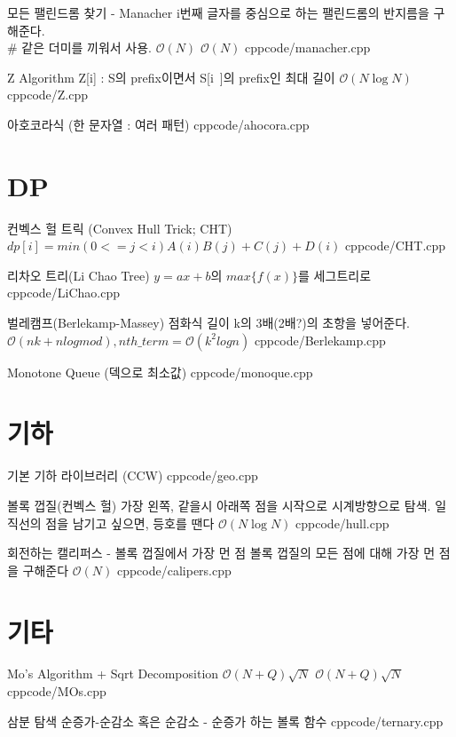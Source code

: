 \documentclass[landscape, 10pt, a4paper, oneside, twocolumn]{extarticle}
\begin{document}
\Algorithm
{모든 팰린드롬 찾기 - Manacher}
{i번째 글자를 중심으로 하는 팰린드롬의 반지름을 구해준다. \\
$\#$ 같은 더미를 끼워서 사용. $\mathcal{O}(N)$
}
{$\mathcal{O}(N)$}
{cpp}{code/manacher.cpp}

\Algorithm
{Z Algorithm}
{Z[i] : S의 prefix이면서 S[i~]의 prefix인 최대 길이}
{$\mathcal{O}(N\log{N})$}
{cpp}{code/Z.cpp}

\Algorithm
{아호코라식 (한 문자열 : 여러 패턴)}
{}
{}
{cpp}{code/ahocora.cpp}


\section{DP}

\Algorithm
{컨벡스 헐 트릭 (Convex Hull Trick; CHT)}
{$dp[i] = min(0 <= j < i){A(i)B(j) + C(j)} + D(i)$}
{}
{cpp}{code/CHT.cpp}

\Algorithm
{리차오 트리(Li Chao Tree)}
{$y=ax+b$의 $max\{f(x)\}$를 세그트리로}
{}
{cpp}{code/LiChao.cpp}

\Algorithm
{벌레캠프(Berlekamp-Massey)}
{점화식 길이 k의 3배(2배?)의 초항을 넣어준다.}
{$\mathcal{O}(nk+nlogmod), nth\_term = \mathcal{O}(k^2logn)$}
{cpp}{code/Berlekamp.cpp}

\Algorithm
{Monotone Queue (덱으로 최소값)}
{}
{}
{cpp}{code/monoque.cpp}



\section{기하}

\Algorithm
{기본 기하 라이브러리 (CCW)}
{}
{}
{cpp}{code/geo.cpp}

\Algorithm
{볼록 껍질(컨벡스 헐)}
{가장 왼쪽, 같을시 아래쪽 점을 시작으로 시계방향으로 탐색.
일직선의 점을 남기고 싶으면, 등호를 땐다}
{$\mathcal{O}(N\log{N})$}
{cpp}{code/hull.cpp}

\Algorithm
{회전하는 캘리퍼스 - 볼록 껍질에서 가장 먼 점}
{볼록 껍질의 모든 점에 대해 가장 먼 점을 구해준다}
{$\mathcal{O}(N)$}
{cpp}{code/calipers.cpp}


\section{기타}

\Algorithm
{Mo's Algorithm + Sqrt Decomposition}
{$\mathcal{O}(N+Q)\sqrt{N}$}
{$\mathcal{O}(N+Q)\sqrt{N}$}
{cpp}{code/MOs.cpp}

\Algorithm
{삼분 탐색}
{순증가-순감소 혹은 순감소 - 순증가 하는 볼록 함수}
{}
{cpp}{code/ternary.cpp}
\end{document}
